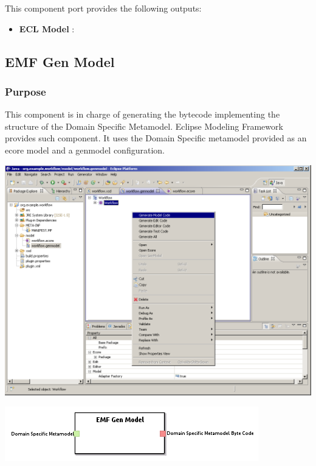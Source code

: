 \documentclass{gemoc} %
\begin{document}
This component port provides the following outputs:
\begin{itemize}
  \item \textbf{ECL Model} :
\end{itemize}


\subsection{EMF Gen Model}


\subsubsection{Purpose}
This component is in charge of generating the bytecode implementing the structure of the Domain Specific Metamodel. Eclipse Modeling Framework provides such component. It uses the Domain Specific metamodel provided as an ecore model and a genmodel configuration.
\begin{center}
\includegraphics*[trim=0.0cm 0.0cm 0cm 0.0cm, clip=true, width=1.0\linewidth]{../images/EMFGenModel.png}
\end{center}

\begin{center}
\includegraphics*[trim=0.0cm 0.0cm 0cm 0.0cm, clip=true]{../images/generated/Generated_EMF_Gen_Model.png}
\end{center}
\end{document}
